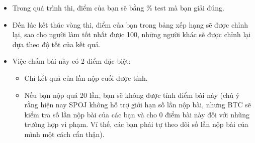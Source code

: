 \begin{itemize}
	\item Trong quá trình thi, điểm của bạn sẽ bằng \% test mà bạn giải đúng.
	\item Đến lúc kết thúc vòng thi, điểm của bạn trong bảng xếp hạng sẽ được chỉnh lại, sao cho người làm tốt nhất được 100, những người khác sẽ được chỉnh lại dựa theo độ tốt của kết quả.
	\item Việc chấm bài này có 2 điểm đặc biệt:           

 
\begin{itemize}
	\item Chỉ kết quả của lần nộp cuối được tính.
	\item Nếu bạn nộp quá 20 lần, bạn sẽ không được tính điểm bài này (chú ý rằng hiện nay SPOJ không hỗ trợ giới hạn số lần nộp bài, nhưng BTC sẽ kiểm tra số lần nộp bài của các bạn và cho 0 điểm bài này đối với nhũng trường hợp vi phạm. Ví thế, các bạn phải tự theo dõi số lần nộp bài của mình một cách cẩn thận).
\end{itemize}
\end{itemize}